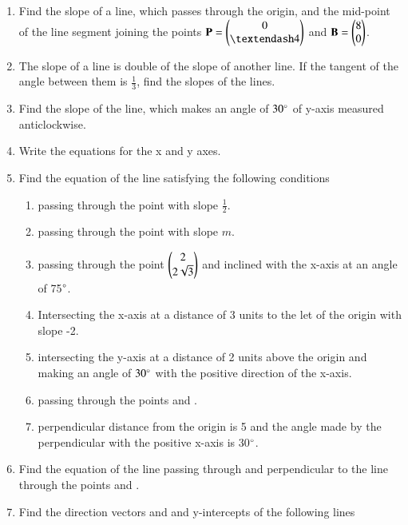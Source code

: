 \begin{enumerate}[label=\arabic*.,ref=\thesubsection.\theenumi]
\item  Find the slope of a line, which passes through the origin, and the mid-point of the line segment joining the points $\vec{P} = \myvec{0\\ – 4}$ and $\mathbf{B} = \begin{pmatrix}8\\ 0\end{pmatrix}$.
\item The slope of a line is double of the slope of another line. If the tangent of the angle
between them is $\frac{1}{3}$, find the slopes of the lines.
\item Find the slope of the line, which makes an angle of $30\degree$ of y-axis measured anticlockwise.
\item Write the equations for the x and y axes.
\item Find the equation of the line satisfying the following conditions 
\begin{enumerate}
\item passing through  the point  with slope $\frac{1}{2}$.
\item passing through the point  with slope $m$.
\item passing through the point $\begin{pmatrix}2\\2\sqrt{3}\end{pmatrix}$ and inclined with the x-axis at an angle of 75$\degree$.
\item Intersecting the x-axis at a distance of 3 units to the let of the origin with slope -2.
\item intersecting the y-axis at a distance of 2 units above the origin and making an angle of $30\degree$ with the positive direction of the x-axis.
\item passing through the points  and .
\item perpendicular distance from the origin is 5 and the angle made by the perpendicular with the positive x-axis is 30$\degree$.
\end{enumerate}
\item Find the equation of the line passing through  and perpendicular to the line through the points  and .
\item Find the direction vectors and and y-intercepts  of the following lines 
\begin{enumerate}

\end{enumerate}
\end{enumerate}
